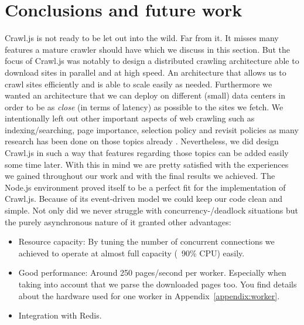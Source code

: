 
\chapter{Conclusions and future work} %
\label{Chapter6} %

Crawl.js is not ready to be let out into the wild. Far from it. It misses many features a mature crawler should have which we discuss in this section. But the focus of Crawl.js was notably to design a distributed crawling architecture able to download sites in parallel and at high speed. An architecture that allows us to crawl sites efficiently and is able to scale easily as needed. Furthermore we wanted an architecture that we can deploy on different (small) data centers in order to be as \emph{close} (in terms of latency) as possible to the sites we fetch. We intentionally left out other important aspects of web crawling such as indexing/searching, page importance, selection policy and revisit policies as many research has been done on those topics already \cite{page_importance1}\cite{page_importance2}\cite{wiki:web_crawler}. Nevertheless, we did design Crawl.js in such a way that features regarding those topics can be added easily some time later.
\newline
\newline
With this in mind we are pretty satisfied with the experiences we gained throughout our work and with the final results we achieved. The Node.js environment proved itself to be a perfect fit for the implementation of Crawl.js. Because of its event-driven model we could keep our code clean and simple. Not only did we never struggle with concurrency-/deadlock situations but the purely asynchronous nature of it granted other advantages:
\begin{itemize}
\item Resource capacity: By tuning the number of concurrent connections we achieved to operate at almost full capacity (~90\% CPU) easily.
\item Good performance: Around 250 pages/second per worker. Especially when taking into account that we parse the downloaded pages too. You find details about the hardware used for one worker in Appendix~\ref{appendix:worker}.
\item Integration with Redis.
\end{itemize}
